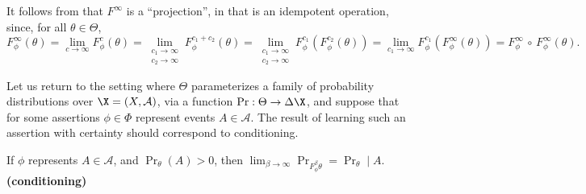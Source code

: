     It follows from  that
    $F^\infty$
    is a ``projection'', in that is an idempotent operation, since,
    for all $\theta \in \Theta$,
    \[
        F^\infty_\phi (\theta)
            = \lim_{c \to \infty} F^{c}_\phi (\theta)
            = \lim_{\substack{c_1 \to \infty \\ c_2 \to \infty}}
                F^{c_1 + c_2}_\phi (\theta)
            = \lim_{\substack{c_1 \to \infty \\ c_2 \to \infty}}
                F^{c_1}_\phi ( F^{c_2}_\phi (\theta))
            = \lim_{c_1 \to \infty} F^{c_1}_\phi (F^{\infty}_\phi(\theta))
            = F^\infty_\phi \,\circ\, F^\infty_\phi  (\theta)
            .
    \]

    Let us return to the setting where $\Theta$ parameterizes a family of probability distributions over $\X = (X, \mathcal A)$, via a function $\Pr : \Theta \to \Delta\X$,
    and suppose that for some assertions $\phi \in \Phi$ represent events $A \in \mathcal A$.
    The result of learning such an assertion with certainty should correspond to conditioning.

    \begin{CFaxioms}
        \item If $\phi$ represents $A \in \mathcal A$, and $\Pr_{\theta}(A) > 0$, then
            $\displaystyle \lim_{\beta\to\infty} \Pr_{ F^\beta_\phi\theta } = \Pr_\theta \mid A$.
            \hfill \textbf{(conditioning)} \label{ax:conditioning}

    \end{CFaxioms}


